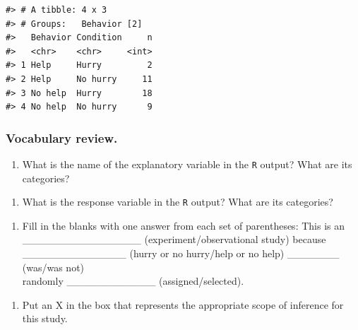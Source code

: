 \documentclass[
]{report}
\providecommand{\tightlist}{%
  \setlength{\itemsep}{0pt}\setlength{\parskip}{0pt}}
\begin{document}
\begin{verbatim}
#> # A tibble: 4 x 3
#> # Groups:   Behavior [2]
#>   Behavior Condition     n
#>   <chr>    <chr>     <int>
#> 1 Help     Hurry         2
#> 2 Help     No hurry     11
#> 3 No help  Hurry        18
#> 4 No help  No hurry      9
\end{verbatim}

\hypertarget{vocabulary-review.-2}{%
\subsubsection*{Vocabulary review.}\label{vocabulary-review.-2}}

\begin{enumerate}
\def\labelenumi{\arabic{enumi}.}
\tightlist
\item
  What is the name of the explanatory variable in the \texttt{R} output? What are its categories?
\end{enumerate}

\vspace{0.2in}

\begin{enumerate}
\def\labelenumi{\arabic{enumi}.}
\setcounter{enumi}{1}
\tightlist
\item
  What is the response variable in the \texttt{R} output? What are its categories?
\end{enumerate}

\vspace{0.2in}


\begin{enumerate}
\def\labelenumi{\arabic{enumi}.}
\setcounter{enumi}{2}
\tightlist
\item
  Fill in the blanks with one answer from each set of parentheses: This is an\\
  \_\_\_\_\_\_\_\_\_\_\_\_\_\_\_\_ (experiment/observational study) because\\
  \_\_\_\_\_\_\_\_\_\_\_\_\_\_ (hurry or no hurry/help or no help) \_\_\_\_\_\_\_ (was/was not)\\
  randomly \_\_\_\_\_\_\_\_\_\_\_\_ (assigned/selected).
\end{enumerate}

\vspace{0.1in}

\begin{enumerate}
\def\labelenumi{\arabic{enumi}.}
\setcounter{enumi}{3}
\tightlist
\item
  Put an X in the box that represents the appropriate scope of inference for this study.
\end{enumerate}
\end{document}
